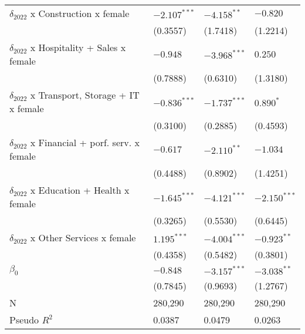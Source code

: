 \begin{tabular}{llll}
$\delta_{2022}$ x Construction x female            &     $-2.107^{***}$ &      $-4.158^{**}$ &           $-0.820$ \\
                                                   &           (0.3557) &           (1.7418) &           (1.2214) \\
$\delta_{2022}$ x Hospitality + Sales x female     &           $-0.948$ &     $-3.968^{***}$ &            $0.250$ \\
                                                   &           (0.7888) &           (0.6310) &           (1.3180) \\
$\delta_{2022}$ x Transport, Storage + IT x female &     $-0.836^{***}$ &     $-1.737^{***}$ &          $0.890^*$ \\
                                                   &           (0.3100) &           (0.2885) &           (0.4593) \\
$\delta_{2022}$ x Financial + porf. serv. x female &           $-0.617$ &      $-2.110^{**}$ &           $-1.034$ \\
                                                   &           (0.4488) &           (0.8902) &           (1.4251) \\
$\delta_{2022}$ x Education + Health x female      &     $-1.645^{***}$ &     $-4.121^{***}$ &     $-2.150^{***}$ \\
                                                   &           (0.3265) &           (0.5530) &           (0.6445) \\
$\delta_{2022}$ x Other Services x female          &      $1.195^{***}$ &     $-4.004^{***}$ &      $-0.923^{**}$ \\
                                                   &           (0.4358) &           (0.5482) &           (0.3801) \\
$\beta_0$                                          &           $-0.848$ &     $-3.157^{***}$ &      $-3.038^{**}$ \\
                                                   &           (0.7845) &           (0.9693) &           (1.2767) \\
N                                                  &            280,290 &            280,290 &            280,290 \\
Pseudo $R^2$                                       &             0.0387 &             0.0479 &             0.0263 \\
\bottomrule
\end{tabular}
